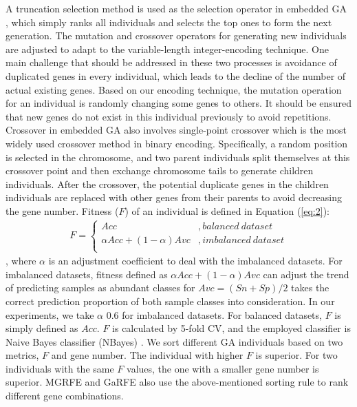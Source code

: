\documentclass[10pt,journal,compsoc]{IEEEtran}
\begin{document}
	A truncation selection method is used as the selection operator in embedded GA \cite{P37}, which simply ranks all individuals and selects the top ones to form the next generation. The mutation and crossover operators for generating new individuals are adjusted to adapt to the variable-length integer-encoding technique. One main challenge that should be addressed in these two processes is avoidance of duplicated genes in every individual, which leads to the decline of the number of actual existing genes. Based on our encoding technique, the mutation operation for an individual is randomly changing some genes to others. It should be ensured that new genes do not exist in this individual previously to avoid repetitions. Crossover in embedded GA also involves single-point crossover which is the most widely used crossover method in binary encoding. Specifically, a random position is selected in the chromosome, and two parent individuals split themselves at this crossover point and then exchange chromosome tails to generate children individuals. After the crossover, the potential duplicate genes in the children individuals are replaced with other genes from their parents to avoid decreasing the gene number. Fitness (\(F\)) of an individual is defined in Equation (\ref{eq:2}):
	{
		\scriptsize
		\begin{eqnarray}\label{eq:2}
		F = \left\{
		\begin{array}{cl}
		Acc & {,{balanced\ dataset}}\\
		\alpha Acc + (1-\alpha)Avc & {,{imbalanced\ dataset}}\\
		\end{array} \right.
		\end{eqnarray}
	}
	, where \(\alpha\) is an adjustment coefficient to deal with the imbalanced datasets. For imbalanced datasets, fitness defined as \(\alpha Acc +(1-\alpha)Avc\) can adjust the trend of predicting samples as abundant classes for \(Avc = (Sn + Sp) \big/ 2\) takes the correct prediction proportion of both sample classes into consideration. In our experiments, we take \(\alpha\) 0.6 for imbalanced datasets. For balanced datasets, \(F\) is simply defined as \(Acc\). \(F\) is calculated by 5-fold CV, and the employed classifier is Naive Bayes classifier (NBayes) \cite{P35}. We sort different GA individuals based on two metrics, \(F\) and gene number. The individual with higher \(F\) is superior. For two individuals with the same \(F\) values, the one with a smaller gene number is superior. MGRFE and GaRFE also use the above-mentioned sorting rule to rank different gene combinations.
	
\end{document}
